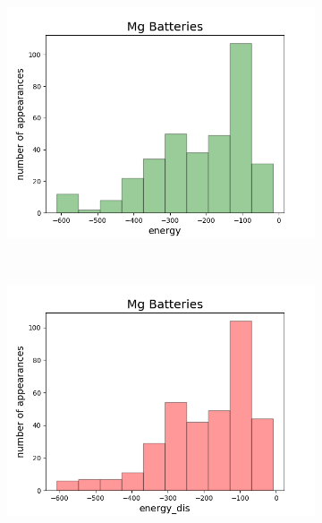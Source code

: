 \begin{figure}[h]
     \centering
          \begin{subfigure}{0.2\textwidth}
         \centering
         \includegraphics[width=\linewidth]{result/figures/distribution/Mg_distrof_energy.png}
         
     \end{subfigure}
     ~ 
     \begin{subfigure}{0.2\textwidth}
         \centering
         \includegraphics[width=\linewidth]{result/figures/distribution/Mg_distrof_energy_dis.png}
         

\end{subfigure}
\end{figure}
